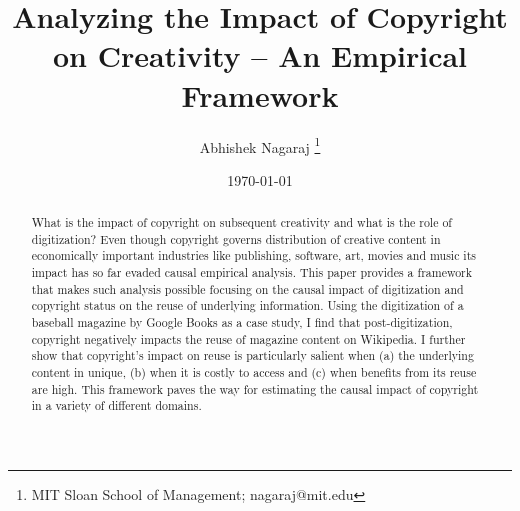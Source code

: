 \documentclass[12pt]{article}
\begin{document}
\setlength{\parskip}{4.5pt}

\baselineskip 18.5pt



\title{Analyzing the Impact of Copyright on Creativity -- An Empirical Framework}

\author{Abhishek Nagaraj \footnote{MIT Sloan School of Management; nagaraj@mit.edu}
}

\date{\today}

\maketitle

\begin{abstract}
What is the impact of copyright on subsequent creativity and what is the role of digitization? Even though copyright governs distribution of creative content in economically important industries like publishing, software, art, movies and music its impact has so far evaded causal empirical analysis. This paper provides a framework that makes such analysis possible focusing on the causal impact of digitization and copyright status on the reuse of underlying information.
Using the digitization of a baseball magazine by Google Books as a case study, I find that post-digitization, copyright negatively impacts the reuse of magazine content on Wikipedia. I further show that copyright's impact on reuse is particularly salient when (a) the underlying content in unique, (b) when it is costly to access and (c) when benefits from its reuse are high. This framework paves the way for estimating the causal impact of copyright in a variety of different domains.
\end{abstract}
\end{document}
